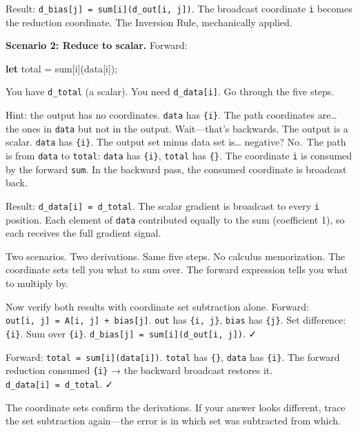 \documentclass[11pt,titlepage]{article}
\newenvironment{Shaded}{}{}
\newcommand{\KeywordTok}[1]{\textcolor[rgb]{0.00,0.44,0.13}{\textbf{#1}}}
\newcommand{\NormalTok}[1]{#1}
\newcommand{\OperatorTok}[1]{\textcolor[rgb]{0.40,0.40,0.40}{#1}}
\begin{document}
Result: \texttt{d\_bias{[}j{]}\ =\ sum{[}i{]}(d\_out{[}i,\ j{]})}. The
broadcast coordinate \texttt{i} becomes the reduction coordinate. The
Inversion Rule, mechanically applied.

\textbf{Scenario 2: Reduce to scalar.} Forward:

\begin{Shaded}
\begin{Highlighting}[]
\KeywordTok{let}\NormalTok{ total = sum}\OperatorTok{[}\NormalTok{i}\OperatorTok{]}\NormalTok{(data}\OperatorTok{[}\NormalTok{i}\OperatorTok{]}\NormalTok{);}
\end{Highlighting}
\end{Shaded}

You have \texttt{d\_total} (a scalar). You need \texttt{d\_data{[}i{]}}.
Go through the five steps.

Hint: the output has no coordinates. \texttt{data} has \texttt{\{i\}}.
The path coordinates are\ldots{} the ones in \texttt{data} but not in
the output. Wait---that's backwards. The output is a scalar.
\texttt{data} has \texttt{\{i\}}. The output set minus data set
is\ldots{} negative? No.~The path is from \texttt{data} to
\texttt{total}: \texttt{data} has \texttt{\{i\}}, \texttt{total} has
\texttt{\{\}}. The coordinate \texttt{i} is consumed by the forward
\texttt{sum}. In the backward pass, the consumed coordinate is broadcast
back.

Result: \texttt{d\_data{[}i{]}\ =\ d\_total}. The scalar gradient is
broadcast to every \texttt{i} position. Each element of \texttt{data}
contributed equally to the sum (coefficient 1), so each receives the
full gradient signal.

Two scenarios. Two derivations. Same five steps. No calculus
memorization. The coordinate sets tell you what to sum over. The forward
expression tells you what to multiply by.

Now verify both results with coordinate set subtraction alone. Forward:
\texttt{out{[}i,\ j{]}\ =\ A{[}i,\ j{]}\ +\ bias{[}j{]}}. \texttt{out}
has \texttt{\{i,\ j\}}, \texttt{bias} has \texttt{\{j\}}. Set
difference: \texttt{\{i\}}. Sum over \texttt{\{i\}}.
\texttt{d\_bias{[}j{]}\ =\ sum{[}i{]}(d\_out{[}i,\ j{]})}. ✓

Forward: \texttt{total\ =\ sum{[}i{]}(data{[}i{]})}. \texttt{total} has
\texttt{\{\}}, \texttt{data} has \texttt{\{i\}}. The forward reduction
consumed \texttt{\{i\}} → the backward broadcast restores it.
\texttt{d\_data{[}i{]}\ =\ d\_total}. ✓

The coordinate sets confirm the derivations. If your answer looks
different, trace the set subtraction again---the error is in which set
was subtracted from which.
\end{document}
